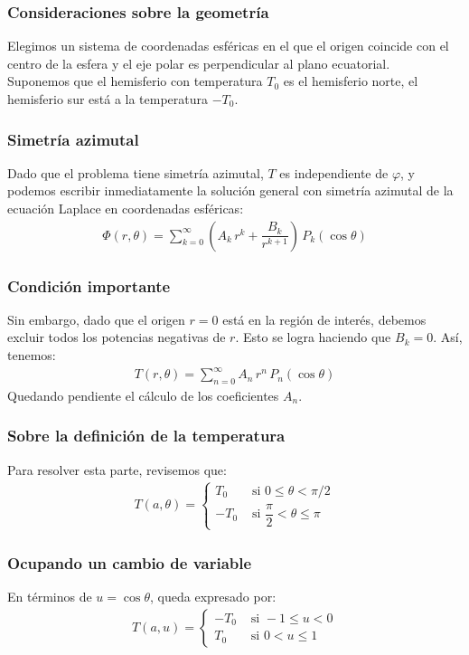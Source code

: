 \documentclass[12pt]{beamer}
\begin{document}
\begin{frame}\label{llama_figura_esferas}
\frametitle{Consideraciones sobre la geometría}
Elegimos un sistema de coordenadas esféricas en el que el origen coincide con el centro de la esfera y el eje polar es perpendicular al plano ecuatorial.
\\
\bigskip
\pause
Suponemos que el hemisferio con temperatura $T_{0}$ es el hemisferio norte, el hemisferio sur está a la temperatura $-T_{0}$.
\hyperlink{figura_esferas}{}
\end{frame}
\begin{frame}
\frametitle{Simetría azimutal}
Dado que el problema tiene simetría azimutal, $T$ es independiente de $\varphi$, y podemos escribir inmediatamente la solución general con simetría azimutal de la ecuación Laplace en coordenadas esféricas:
\pause
\begin{align*}
\Phi (r, \theta) = \sum_{k=0}^{\infty} \left( A_{k} \, r^{k} + \dfrac{B_{k}}{r^{k+1}} \right) \, P_{k} (\cos \theta)
\end{align*}
\end{frame}
\begin{frame}
\frametitle{Condición importante}
Sin embargo, dado que el origen $r = 0$ está en la región de interés, debemos excluir todos los potencias negativas de $r$. \pause Esto se logra haciendo que $B_{k} = 0$. Así, tenemos:
\pause
\begin{align}
T(r, \theta) = \sum_{n=0}^{\infty} A_{n} \, r^{n} \, P_{n} (\cos \theta)
\label{eq:ecuacion_26_50}
\end{align}
Quedando pendiente el cálculo de los coeficientes $A_{n}$.
\end{frame}
\begin{frame}
\frametitle{Sobre la definición de la temperatura}
Para resolver esta parte, revisemos que:
\begin{align*}
T (a, \theta) = \begin{cases}
T_{0} & \mbox{ si } 0 \leq \theta < \pi / 2 \\[1em]
-T_{0} & \mbox{ si } \dfrac{\pi}{2} < \theta \leq \pi
\end{cases}
\end{align*}
\end{frame}
\begin{frame}
\frametitle{Ocupando un cambio de variable}
En términos de $u = \cos \theta$, queda expresado por:
\begin{align*}
T (a, u) = \begin{cases}
-T_{0} & \mbox{ si } -1 \leq u < 0 \\[1em]
T_{0} & \mbox{ si } 0 < u \leq 1
\end{cases}
\end{align*}
\end{frame}
\end{document}
